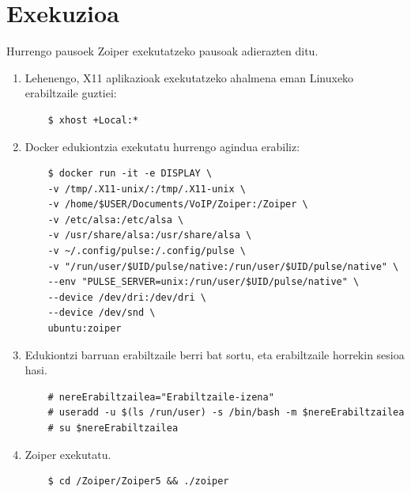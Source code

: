\section{Exekuzioa}

Hurrengo pausoek Zoiper exekutatzeko pausoak adierazten ditu.
\begin{enumerate}
    \item Lehenengo, X11 aplikazioak exekutatzeko ahalmena eman Linuxeko erabiltzaile guztiei:
    \begin{verbatim}
    $ xhost +Local:*
    \end{verbatim}
    \item Docker edukiontzia exekutatu hurrengo agindua erabiliz:
    \begin{verbatim}
    $ docker run -it -e DISPLAY \
    -v /tmp/.X11-unix/:/tmp/.X11-unix \
    -v /home/$USER/Documents/VoIP/Zoiper:/Zoiper \
    -v /etc/alsa:/etc/alsa \
    -v /usr/share/alsa:/usr/share/alsa \
    -v ~/.config/pulse:/.config/pulse \
    -v "/run/user/$UID/pulse/native:/run/user/$UID/pulse/native" \
    --env "PULSE_SERVER=unix:/run/user/$UID/pulse/native" \
    --device /dev/dri:/dev/dri \
    --device /dev/snd \
    ubuntu:zoiper
    \end{verbatim}
    \item Edukiontzi barruan erabiltzaile berri bat sortu, eta erabiltzaile horrekin sesioa hasi.
    \begin{verbatim}
    # nereErabiltzailea="Erabiltzaile-izena"
    # useradd -u $(ls /run/user) -s /bin/bash -m $nereErabiltzailea
    # su $nereErabiltzailea
    \end{verbatim}
    \item Zoiper exekutatu.
    \begin{verbatim}
    $ cd /Zoiper/Zoiper5 && ./zoiper
    \end{verbatim}
\end{enumerate}